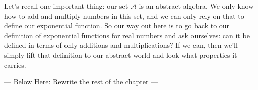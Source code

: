 Let's recall one important thing: our set $\mathcal{A}$ is an abstract algebra. We only know how to add and multiply numbers in this set, and we can only rely on that to define our exponential function. So our way out here is to go back to our definition of exponential functions for real numbers and ask ourselves: can it be defined in terms of only additions and multiplications? If we can, then we'll simply lift that definition to our abstract world and look what properties it carries.


--- Below Here: Rewrite the rest of the chapter ---











